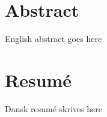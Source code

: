 \pagestyle{empty}
\vspace*{\fill}%

\section*{Abstract}
English abstract goes here

\section*{Resumé}
Dansk resumé skrives here


\vspace*{\fill}%
